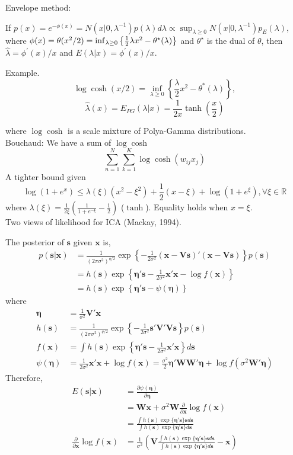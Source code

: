 \documentclass[11pt]{article}%
\begin{document}
Envelope method:

If $p(x) = e^{ - \phi (x ) } = N ( x | 0 , \lambda^{-1} ) p(\lambda) d\lambda \propto \sup_{ \lambda \geq 0 } N ( x | 0 , \lambda^{-1} ) p_E ( \lambda ) $, where  $\phi(x) = \theta(x^2/2) = \inf_{\lambda\geq 0} \left\{\frac{1}{2} \lambda x^2 - \theta^\star(\lambda)\right\}$ and $\theta^\star$ is the dual of $\theta$, then  $ \hat{\lambda} = \phi^\prime ( x ) / x $ and $ E( \lambda | x ) = \phi^\prime ( x ) / x $.

Example.
$$
\log \cosh (x/2) = \inf_{\lambda\geq 0} \left\{ \frac{\lambda}{2} x^2 - \theta^*(\lambda)\right\},
$$
$$
\hat\lambda(x) = E_{PG}(\lambda|x) = \frac{1}{2x}\tanh(\frac{x}{2})
$$

where $\log\cosh$ is a scale mixture of Polya-Gamma distributions. \\

Bouchaud: 
We have a sum of $\log\cosh$
$$
\sum_{n=1}^N\sum_{k=1}^K \log\cosh(w_{ij} x_j)
$$
A tighter bound given 
$$
\log(1+e^x) \leq \lambda(\xi) (x^2-\xi^2) + \frac{1}{2}(x-\xi) + \log(1+e^\xi), \forall \xi\in\mathbb{R}
$$
where $\lambda(\xi)= \frac{1}{2\xi} (\frac{1}{1+e^{-\xi}} - \frac{1}{2})$ ($\tanh$). Equality holds when $x = \xi$.\\

Two views of likelihood for ICA (Mackay, 1994).

The posterior of $\bm s$ given $\bm x$ is, 
\begin{align*}
p(\bm s| \bm x) &= \frac{1}{(2\pi \sigma^2)^{q/2}}\exp\left\{-\frac{1}{2\sigma^2}(\bm{x - Vs})'(\bm{x - Vs})\right\} p(\bm s)\\
&= h(\bm s) \exp\left\{\bm{\eta's} - \frac{1}{2\sigma^2}\bm{x'x} -\log f(\bm x) \right\}\\
&= h(\bm s) \exp\left\{\bm{\eta's} - \psi(\bm\eta) \right\}
\end{align*}
where
\begin{align*}
\bm\eta &= \frac{1}{\sigma^2}\bm{V'x} \\
h(\bm s) &= \frac{1}{(2\pi \sigma^2)^{q/2}} \exp\left\{-\frac{1}{2\sigma^2} \bm{s'V'Vs}\right\} p(\bm s)\\
f(\bm x) &= \int  h(\bm s) \exp\left\{\bm{\eta's} - \frac{1}{2\sigma^2}\bm{x'x} \right\} d\bm s\\
\psi(\bm \eta) &= \frac{1}{2\sigma^2}\bm{x'x} +\log f(\bm x) = \frac{\sigma^2}{2}\bm{\eta'WW'\eta} + \log f(\sigma^2 \bm{W'\eta})
\end{align*}
Therefore,
\begin{align*}
E(\bm s | \bm x) &= \frac{\partial\psi(\bm\eta)}{\partial \bm\eta}\\
&= \bm{Wx} + \sigma^2\bm W\frac{\partial}{\partial \bm x}\log f(\bm x) \\
&= \frac{\int h(\bm s)\exp\{\bm{\eta's}\} \bm s d\bm s}{\int h(\bm s)\exp\{\bm{\eta's}\} d\bm s} \\
\frac{\partial}{\partial \bm x}\log f(\bm x) &= \frac{1}{\sigma^2}\left(\bm{V} \frac{\int h(\bm s)\exp\{\bm{\eta's}\} \bm s d\bm s}{\int h(\bm s)\exp\{\bm{\eta's}\} d\bm s} - \bm x\right)
\end{align*}
\end{document}
